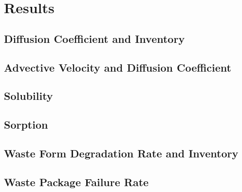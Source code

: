 \section{Results}
\subsection{Diffusion Coefficient and Inventory}

\subsection{Advective Velocity and Diffusion Coefficient}

\subsection{Solubility}

\subsection{Sorption}

\subsection{Waste Form Degradation Rate and Inventory}

\subsection{Waste Package Failure Rate}

